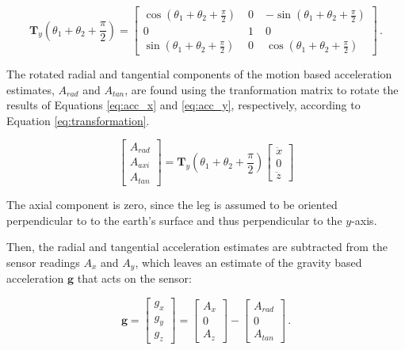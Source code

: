 \begin{equation}
\mathbf{T}_y(\theta_1 + \theta_2 + \frac{\pi}{2}) = \begin{bmatrix}
    \cos (\theta_1 + \theta_2 + \frac{\pi}{2}) \; & 0 \; & -\sin (\theta_1 + \theta_2 + \frac{\pi}{2}) \\
    0 \; & 1 \; & 0 \\
    \sin (\theta_1 + \theta_2 + \frac{\pi}{2}) \; & 0 \; & \cos (\theta_1 + \theta_2 + \frac{\pi}{2})
    \end{bmatrix}\,.
\end{equation}

\noindent
The rotated radial and tangential components of the motion based acceleration estimates, $A_{rad}$ and $A_{tan}$, are found using the tranformation matrix to rotate the results of Equations \ref{eq:acc_x} and \ref{eq:acc_y}, respectively, according to Equation \ref{eq:transformation}.

\begin{equation}
  \begin{bmatrix}
  	A_{rad} \\
  	A_{axi} \\
  	A_{tan}
  \end{bmatrix} = \mathbf{T}_y(\theta_1 + \theta_2 + \frac{\pi}{2}) \begin{bmatrix}
  	\ddot{x} \\
  	0 \\
	\ddot{z}
  \end{bmatrix}
\end{equation}

\noindent
The axial component is zero, since the leg is assumed to be oriented perpendicular to to the earth's surface and thus perpendicular to the $y$-axis.

Then, the radial and tangential acceleration estimates are subtracted from the sensor readings $A_x$ and $A_y$, which leaves an estimate of the gravity based acceleration $\mathbf{g}$ that acts on the sensor:

\begin{equation}
\mathbf{g} = \begin{bmatrix}
    g_x \\
    g_y \\
    g_z 
    \end{bmatrix} = 
    \begin{bmatrix}
    A_x \\
    0 \\
    A_z 
    \end{bmatrix} -
    \begin{bmatrix}
    A_{rad} \\
    0 \\
    A_{tan} 
    \end{bmatrix}\,.
\end{equation}

